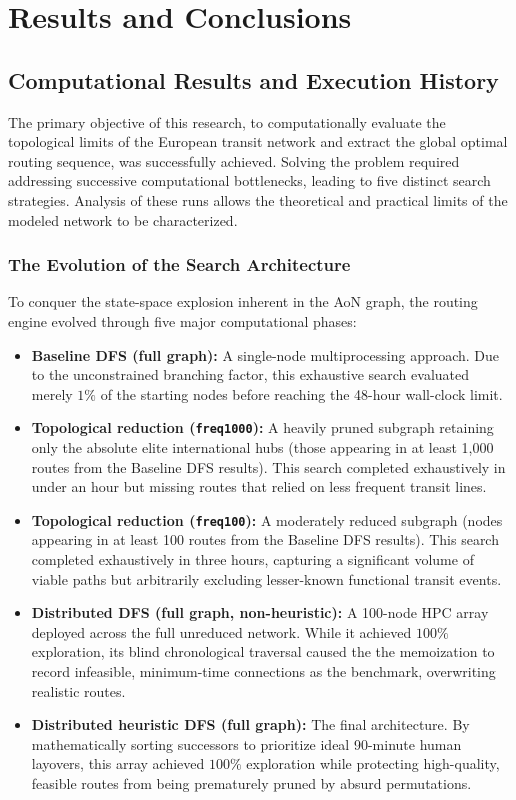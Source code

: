 \chapter{Results and Conclusions}
\label{chap:results_conclusions}

\section{Computational Results and Execution History}
\label{sec:computational_results_execution_history}

The primary objective of this research, to computationally evaluate the topological limits of the European transit network and extract the global optimal routing sequence, was successfully achieved. Solving the problem required addressing successive computational bottlenecks, leading to five distinct search strategies. Analysis of these runs allows the theoretical and practical limits of the modeled network to be characterized.

\subsection{The Evolution of the Search Architecture}
\label{subsec:evolution_search_architecture}

To conquer the state-space explosion inherent in the AoN graph, the routing engine evolved through five major computational phases:
\begin{itemize}
    \item \textbf{Baseline DFS (full graph):} A single-node multiprocessing approach. Due to the unconstrained branching factor, this exhaustive search evaluated merely $1\%$ of the starting nodes before reaching the 48-hour wall-clock limit.
    \item \textbf{Topological reduction (\texttt{freq1000}):} A heavily pruned subgraph retaining only the absolute elite international hubs (those appearing in at least 1,000 routes from the Baseline DFS results). This search completed exhaustively in under an hour but missing routes that relied on less frequent transit lines.
    \item \textbf{Topological reduction (\texttt{freq100}):} A moderately reduced subgraph (nodes appearing in at least 100 routes from the Baseline DFS results). This search completed exhaustively in three hours, capturing a significant volume of viable paths but arbitrarily excluding lesser-known functional transit events.
    \item \textbf{Distributed DFS (full graph, non-heuristic):} A 100-node HPC array deployed across the full unreduced network. While it achieved $100\%$ exploration, its blind chronological traversal caused the the memoization to record infeasible, minimum-time connections as the benchmark, overwriting realistic routes.
    \item \textbf{Distributed heuristic DFS (full graph):} The final architecture. By mathematically sorting successors to prioritize ideal 90-minute human layovers, this array achieved $100\%$ exploration while protecting high-quality, feasible routes from being prematurely pruned by absurd permutations.
\end{itemize}

